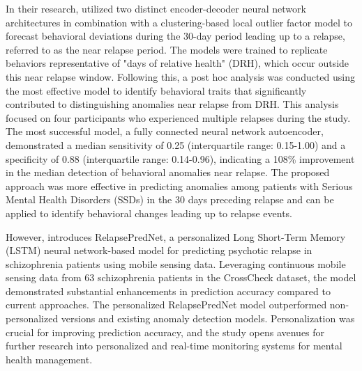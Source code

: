 In their research, \cite{adler2020predicting} utilized two distinct encoder-decoder neural network architectures in combination with a clustering-based local outlier factor model to forecast behavioral deviations during the 30-day period leading up to a relapse, referred to as the near relapse period. The models were trained to replicate behaviors representative of "days of relative health" (DRH), which occur outside this near relapse window. Following this, a post hoc analysis was conducted using the most effective model to identify behavioral traits that significantly contributed to distinguishing anomalies near relapse from DRH. This analysis focused on four participants who experienced multiple relapses during the study. The most successful model, a fully connected neural network autoencoder, demonstrated a median sensitivity of 0.25 (interquartile range: 0.15-1.00) and a specificity of 0.88 (interquartile range: 0.14-0.96), indicating a 108\% improvement in the median detection of behavioral anomalies near relapse. The proposed approach was more effective in predicting anomalies among patients with Serious Mental Health Disorders (SSDs) in the 30 days preceding relapse and can be applied to identify behavioral changes leading up to relapse events. 

However, \citet{lamichhane2022psychotic}introduces RelapsePredNet, a personalized Long Short-Term Memory (LSTM) neural network-based model for predicting psychotic relapse in schizophrenia patients using mobile sensing data. Leveraging continuous mobile sensing data from 63 schizophrenia patients in the CrossCheck dataset, the model demonstrated substantial enhancements in prediction accuracy compared to current approaches. The personalized RelapsePredNet model outperformed non-personalized versions and existing anomaly detection models. Personalization was crucial for improving prediction accuracy, and the study opens avenues for further research into personalized and real-time monitoring systems for mental health management.
